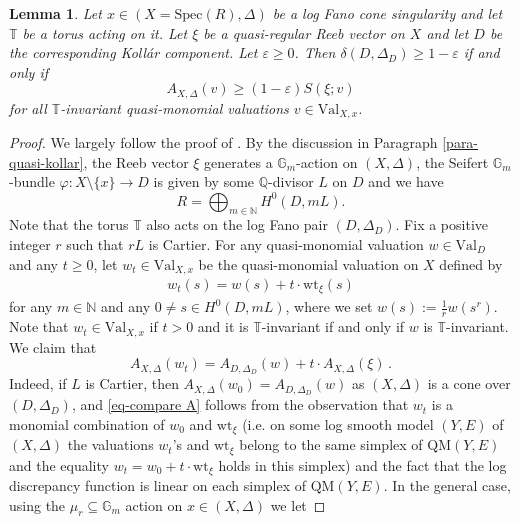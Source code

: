 \documentclass[12pt]{amsart}
\newtheorem{lem}[prop]{Lemma}
\theoremstyle{definition}
\newcommand{\bQ}{\mathbb{Q}}
\newcommand{\bN}{\mathbb{N}}
\newcommand{\bT}{\mathbb{T}}
\newcommand{\bG}{\mathbb{G}}
\newcommand{\Spec}{\mathrm{Spec}}
\newcommand{\ord}{\mathrm{ord}}
\newcommand{\Val}{\mathrm{Val}}
\newcommand{\QM}{\mathrm{QM}}
\newcommand{\wt}{\mathrm{wt}}
\numberwithin{equation}{section}
\begin{document}
\begin{lem} \label{lem:delta>? criterion}
Let $x\in (X=\Spec(R),\Delta)$ be a log Fano cone singularity and let $\bT$ be a torus acting on it. Let $\xi$ be a quasi-regular Reeb vector on $X$ and let $D$ be the corresponding Koll\'ar component. Let $\varepsilon\ge 0$. Then $\delta(D,\Delta_D)\ge 1-\varepsilon$ if and only if 
\begin{equation} \label{eq:A>=(1-epsilon)S}
A_{X,\Delta}(v)\ge (1-\varepsilon)S(\xi;v)  
\end{equation}
for all $\bT$-invariant quasi-monomial valuations $v\in \Val_{X,x}$.
\end{lem}

\begin{proof}
We largely follow the proof of \cite[Theorem 3.6]{XZ-uniqueness}. %
By the discussion in Paragraph \ref{para-quasi-kollar}, the Reeb vector $\xi$ generates a $\bG_m$-action on $(X,\Delta)$, the Seifert $\bG_m$-bundle $\varphi\colon X\setminus\{x\}\to D$ is given by some $\bQ$-divisor $L$ on $D$ and we have 
\[
R=\bigoplus_{m\in\bN} H^0(D,mL).
\]
Note that the torus $\bT$ also acts on the log Fano pair $(D,\Delta_D)$. Fix a positive integer $r$ such that $rL$ is Cartier. For any quasi-monomial valuation $w\in \Val_D$ and any $t\ge 0$, let $w_t\in \Val_{X,x}$ be the quasi-monomial valuation on $X$ defined by
\begin{eqnarray}\label{eq-wt}
w_t(s) = w(s)+ t\cdot \wt_\xi(s) %
\end{eqnarray}
for any $m\in\bN$ and any $0\neq s\in H^0(D,mL)$, where we set $w(s):=\frac{1}{r}w(s^r)$. Note that $w_t\in \Val_{X,x}$ if $t>0$ and it is $\bT$-invariant if and only if $w$ is $\bT$-invariant. We claim that 
\begin{equation}\label{eq-compare A}
A_{X,\Delta}(w_t) = A_{D,\Delta_D}(w)+t\cdot A_{X,\Delta}(\xi)\, .
\end{equation}
Indeed, if $L$ is Cartier, then $A_{X,\Delta}(w_0)=A_{D,\Delta_D}(w)$ as $(X,\Delta)$ is a cone over $(D,\Delta_D)$, and \eqref{eq-compare A} follows from the observation that $w_t$ is a monomial combination of $w_0$ and $\wt_\xi$ (i.e. on some log smooth model $(Y,E)$ of $(X,\Delta)$ the valuations $w_t$'s and $\wt_\xi$ belong to the same simplex of $\QM(Y,E)$ and the equality $w_t=w_0+t\cdot \wt_\xi$ holds in this simplex) and the fact that the log discrepancy function is linear on each simplex of $\QM(Y,E)$. In the general case, using the $\mu_r\subseteq \bG_m$ action on $x\in (X,\Delta)$ we let 

\end{proof}
\end{document}
